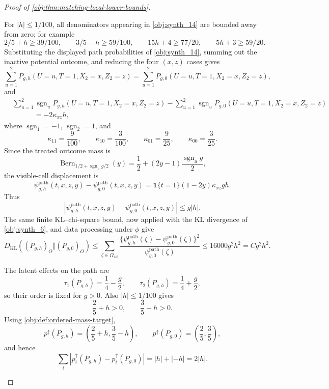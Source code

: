 \begin{proof}[Proof of \cref{obj:thm:matching-local-lower-bounds}]
\begin{enumerate}
For \(|h|\le1/100\), all denominators appearing in \cref{obj:synth_14} are bounded away from zero; for example
\[
2/5+h\ge39/100,\qquad
3/5-h\ge59/100,\qquad
15h+4\ge77/20,\qquad
5h+3\ge59/20 .
\]
Substituting the displayed path probabilities of \cref{obj:synth_14}, summing out the inactive potential outcome, and reducing the four \((x,z)\) cases gives
\[
\sum_{u=1}^{2}P_{g,h}(U=u,T=1,X_2=x,Z_2=z)
=
\sum_{u=1}^{2}P_{g,0}(U=u,T=1,X_2=x,Z_2=z),
\]
and
\[
\begin{aligned}
&\sum_{u=1}^{2}\operatorname{sgn}_u
P_{g,h}(U=u,T=1,X_2=x,Z_2=z)
-
\sum_{u=1}^{2}\operatorname{sgn}_u
P_{g,0}(U=u,T=1,X_2=x,Z_2=z)  \\
&\hspace{3em}=
-2\kappa_{xz}h,
\end{aligned}
\]
where \(\operatorname{sgn}_1=-1\), \(\operatorname{sgn}_2=1\), and
\[
\kappa_{11}=\frac9{100},\qquad
\kappa_{10}=\frac3{100},\qquad
\kappa_{01}=\frac9{25},\qquad
\kappa_{00}=\frac3{25}.
\]
Since the treated outcome mass is
\[
\operatorname{Bern}_{1/2+\operatorname{sgn}_u g/2}(y)
=
\frac12+(2y-1)\frac{\operatorname{sgn}_u g}{2},
\]
the visible-cell displacement is
\[
\psi^{\mathrm{path}}_{g,h}(t,x,z,y)-\psi^{\mathrm{path}}_{g,0}(t,x,z,y)
=
\mathbf 1\{t=1\}(1-2y)\kappa_{xz}gh .
\]
Thus
\[
\left|\psi^{\mathrm{path}}_{g,h}(t,x,z,y)-\psi^{\mathrm{path}}_{g,0}(t,x,z,y)\right|
\le g|h|.
\]
The same finite KL--chi-square bound, now applied with the KL divergence of \cref{obj:synth_6}, and data processing under \(\phi\) give
\[
D_{\mathrm{KL}}\!\left((P_{g,h})_O\Vert(P_{g,0})_O\right)
\le
\sum_{\zeta\in\Omega_{\mathrm{vis}}}
\frac{\{\psi^{\mathrm{path}}_{g,h}(\zeta)-\psi^{\mathrm{path}}_{g,0}(\zeta)\}^2}
{\psi^{\mathrm{path}}_{g,0}(\zeta)}
\le
16000g^2h^2
=
C g^2h^2.
\]

The latent effects on the path are
\[
\tau_1(P_{g,h})=\frac14-\frac g2,
\qquad
\tau_2(P_{g,h})=\frac14+\frac g2,
\]
so their order is fixed for \(g>0\).  Also \(|h|\le1/100\) gives
\[
\frac25+h>0,\qquad \frac35-h>0.
\]
Using \cref{obj:def:ordered-mass-target},
\[
p^{\uparrow}(P_{g,h})=\left(\frac25+h,\frac35-h\right),
\qquad
p^{\uparrow}(P_{g,0})=\left(\frac25,\frac35\right),
\]
and hence
\[
\sum_i\left|p_i^{\uparrow}(P_{g,h})-p_i^{\uparrow}(P_{g,0})\right|
=
|h|+|-h|
=
2|h|.
\] %


\end{enumerate}
\end{proof}
